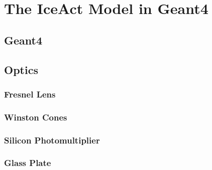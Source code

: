 \chapter{The IceAct Model in Geant4}

\section{Geant4}

\section{Optics}

\subsection{Fresnel Lens}

\subsection{Winston Cones}

\subsection{Silicon Photomultiplier}

\subsection{Glass Plate}

